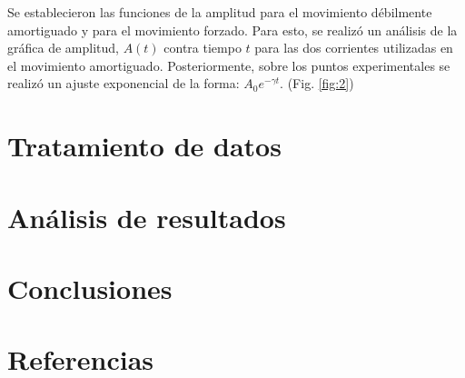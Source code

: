 \documentclass[spanish,notitlepage,letterpaper, 12pt]{article}
\begin{document}
Se establecieron las funciones de la amplitud para el movimiento
débilmente amortiguado y para el movimiento forzado. Para esto, se realizó un análisis
de la gráfica de amplitud, $A(t)$ contra tiempo $t$ para las dos
corrientes utilizadas en el movimiento amortiguado. Posteriormente, sobre los puntos
experimentales se realizó un ajuste exponencial de la forma: $A_0e^{-\gamma t}$. (Fig. \ref{fig:2})
\section{Tratamiento de datos} \label{TD}
\section{Análisis de resultados}
\section{Conclusiones}
\section{Referencias} 


\end{document}
